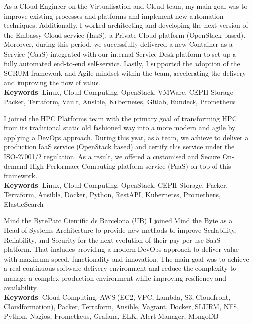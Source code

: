 {
As a Cloud Engineer on the Virtualisation and Cloud team, my main goal was to improve existing processes and platforms and implement new automation techniques. Additionally, I worked architecting and developing the next version of the Embassy Cloud service (IaaS), a Private Cloud platform (OpenStack based). Moreover, during this period, we successfully delivered a new Container as a Service (CaaS) integrated with our internal Service Desk platform to set up a fully automated end-to-end self-service. Lastly, I supported the adoption of the SCRUM framework and Agile mindset within the team, accelerating the delivery and improving the flow of value.
\medskip\\ 
\textbf{Keywords:}  Linux, Cloud Computing, OpenStack, VMWare, CEPH Storage, Packer, Terraform, Vault, Ansible, Kubernetes, Gitlab, Rundeck, Prometheus \medskip}

{
I joined the HPC Platforms team with the primary goal of transforming HPC from its traditional static old fashioned way into a more modern and agile by applying a DevOps approach. During this year, as a team, we achieve to deliver a production IaaS service (OpenStack based) and certify this service under the ISO-27001/2 regulation. As a result, we offered a customised and Secure On-demand High-Performace Computing platform service (PaaS) on top of this framework.
\medskip\\ 
\textbf{Keywords:}  Linux, Cloud Computing, OpenStack, CEPH Storage, Packer, Terraform, Ansible, Docker, Python, RestAPI, Kubernetes, Prometheus, ElasticSearch \medskip}

{Mind the Byte}{Parc Científic de Barcelona (UB)}{}
{
I joined Mind the Byte as a Head of Systems Architecture to provide new methods to improve Scalability, Reliability, and Security for the next evolution of their pay-per-use SaaS platform. That includes providing a modern DevOps approach to deliver value with maximum speed, functionality and innovation. The main goal was to achieve a real continuous software delivery environment and reduce the complexity to manage a complex production environment while improving resiliency and availability.
\medskip\\ 
\textbf{Keywords:}  Cloud Computing, AWS (EC2, VPC, Lambda, S3, Cloudfront, Cloudformation), Packer, Terraform, Ansible, Vagrant, Docker, SLURM, NFS, Python, Nagios, Prometheus, Grafana, ELK, Alert Manager, MongoDB\medskip}

